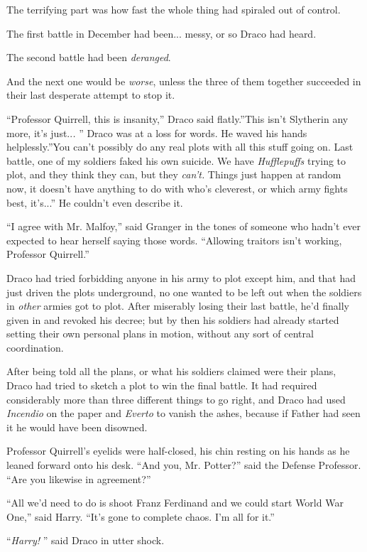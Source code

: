 The terrifying part was how fast the whole thing had spiraled out of
control.

The first battle in December had been... messy, or so Draco had
heard.

The second battle had been \emph{deranged}.

And the next one would be \emph{worse}, unless the three of them
together succeeded in their last desperate attempt to stop it.

``Professor Quirrell, this is insanity,'' Draco said flatly.''This isn't
Slytherin any more, it's just..\emph{.} '' Draco was at a loss for words.
He waved his hands helplessly.''You can't possibly do any real plots
with all this stuff going on. Last battle, one of my soldiers faked his
own suicide. We have \emph{Hufflepuffs} trying to plot, and they think
they can, but they \emph{can't.} Things just happen at random now, it
doesn't have anything to do with who's cleverest, or which army fights
best, it's...'' He couldn't even describe it.

``I agree with Mr. Malfoy,'' said Granger in the tones of someone who
hadn't ever expected to hear herself saying those words. ``Allowing
traitors isn't working, Professor Quirrell.''

Draco had tried forbidding anyone in his army to plot except him, and
that had just driven the plots underground, no one wanted to be left out
when the soldiers in \emph{other} armies got to plot. After miserably
losing their last battle, he'd finally given in and revoked his decree;
but by then his soldiers had already started setting their own personal
plans in motion, without any sort of central coordination.

After being told all the plans, or what his soldiers claimed were their
plans, Draco had tried to sketch a plot to win the final battle. It had
required considerably more than three different things to go right, and
Draco had used \emph{Incendio} on the paper and \emph{Everto} to vanish
the ashes, because if Father had seen it he would have been disowned.

Professor Quirrell's eyelids were half-closed, his chin resting on his
hands as he leaned forward onto his desk. ``And you, Mr. Potter?'' said
the Defense Professor. ``Are you likewise in agreement?''

``All we'd need to do is shoot Franz Ferdinand and we could start World
War One,'' said Harry. ``It's gone to complete chaos. I'm all for it.''

``\emph{Harry!} '' said Draco in utter shock.

